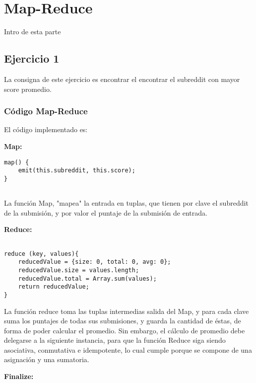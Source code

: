 \section{Map-Reduce}

Intro de esta parte

\subsection{Ejercicio 1}

La consigna de este ejercicio es encontrar el encontrar el subreddit con mayor score promedio.

\subsubsection{C\'odigo Map-Reduce}

El c\'odigo implementado es:

\textbf{Map:}

\begin{lstlisting}
map() {
    emit(this.subreddit, this.score);
}


\end{lstlisting}

La funci\'on Map, "mapea"  la entrada en tuplas, que tienen por clave el subreddit de la submisi\'on, y por valor el puntaje de la submisi\'on de entrada.

\vspace{2mm}

\textbf{Reduce:}

\begin{lstlisting}

reduce (key, values){
    reducedValue = {size: 0, total: 0, avg: 0};
    reducedValue.size = values.length;
    reducedValue.total = Array.sum(values);
    return reducedValue;
}

\end{lstlisting}

La funci\'on reduce toma las tuplas intermedias salida del Map, y para cada clave suma los puntajes de todas sus submisiones, y guarda la cantidad de \'estas, de forma de poder calcular el promedio. Sin embargo, el c\'alculo de promedio debe delegarse a la siguiente instancia, para que la funci\'on Reduce siga siendo asociativa, conmutativa e idempotente, lo cual cumple porque se compone de una asignaci\'on y una sumatoria.

\vspace{2mm}

\textbf{Finalize:}

